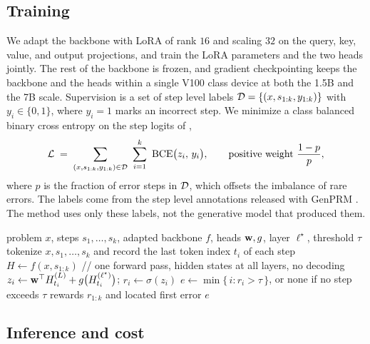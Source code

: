 \subsection{Training}
\label{sec:method-train}

We adapt the backbone with LoRA \citep{hu2021lora} of rank $16$ and scaling $32$ on the query, key, value, and output projections, and train the LoRA parameters and the two heads jointly. The rest of the backbone is frozen, and gradient checkpointing keeps the backbone and the heads within a single V100 class device at both the 1.5B and the 7B scale. Supervision is a set of step level labels $\mathcal{D}=\{(x, s_{1:k}, y_{1:k})\}$ with $y_i\in\{0,1\}$, where $y_i=1$ marks an incorrect step. We minimize a class balanced binary cross entropy on the step logits of ,
\begin{equation}
  \cL \;=\; \sum_{(x,s_{1:k},y_{1:k})\in\cD}\ \sum_{i=1}^{k}\ \mathrm{BCE}\big(z_i,\, y_i\big),
  \qquad
  \text{positive weight } \frac{1-p}{p},
  \label{eq:loss}
\end{equation}
where $p$ is the fraction of error steps in $\mathcal{D}$, which offsets the imbalance of rare errors. The labels come from the step level annotations released with GenPRM \citep{zhao2025genprm}. The method uses only these labels, not the generative model that produced them.

\begin{algorithm}[t]
  \caption{Introspective scoring of a $k$ step solution (inference)}
  \label{alg:score}
  \begin{algorithmic}[1]
    \REQUIRE problem $x$, steps $s_1,\dots,s_k$, adapted backbone $f$, heads $\mathbf{w}, g$, layer $\ell^\star$, threshold $\tau$
    \STATE tokenize $x, s_1, \dots, s_k$ and record the last token index $t_i$ of each step
    \STATE $H \leftarrow f(x, s_{1:k})$ \hfill // one forward pass, hidden states at all layers, no decoding
      \STATE $z_i \leftarrow \mathbf{w}^\top H^{(L)}_{t_i} + g\big(H^{(\ell^\star)}_{t_i}\big)$; \quad $r_i \leftarrow \sigma(z_i)$
    \ENDFOR
    \STATE $e \leftarrow \min\{\, i : r_i > \tau \,\}$, or none if no step exceeds $\tau$
    \RETURN rewards $r_{1:k}$ and located first error $e$
  \end{algorithmic}
\end{algorithm}

\subsection{Inference and cost}
\label{sec:method-infer}

